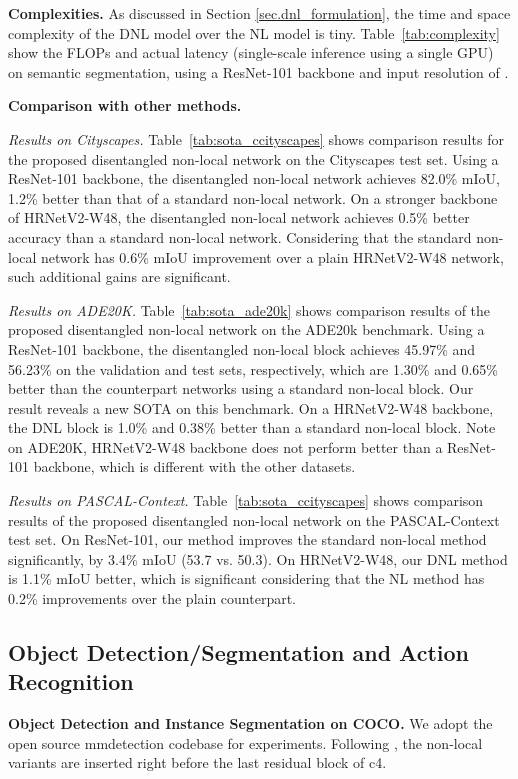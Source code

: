 \documentclass[runningheads]{llncs}
\begin{document}
\noindent \textbf{Complexities.} As discussed in Section \ref{sec.dnl_formulation}, the time and space complexity of the DNL model over the NL model is tiny. Table~\ref{tab:complexity} show the FLOPs and actual latency (single-scale inference using a single GPU) on semantic segmentation, using a ResNet-101 backbone and input resolution of .

\noindent \textbf{Comparison with other methods.}

\noindent \emph{Results on Cityscapes.}
Table~\ref{tab:sota_ccityscapes} shows comparison results for the proposed disentangled non-local network on the Cityscapes test set. Using a ResNet-101 backbone, the disentangled non-local network achieves 82.0\% mIoU, 1.2\% better than that of a standard non-local network. On a stronger backbone of HRNetV2-W48, the disentangled non-local network achieves 0.5\% better accuracy than a standard non-local network. Considering that the standard non-local network has 0.6\% mIoU improvement over a plain HRNetV2-W48 network, such additional gains are significant.

\noindent \emph{Results on ADE20K.}
Table~\ref{tab:sota_ade20k} shows comparison results of the proposed disentangled non-local network on the ADE20k benchmark.
Using a ResNet-101 backbone, the disentangled non-local block achieves 45.97\% and 56.23\% on the validation and test sets, respectively, which are 1.30\% and 0.65\% better than the counterpart networks using a standard non-local block. Our result reveals a new SOTA on this benchmark. On a HRNetV2-W48 backbone, the DNL block is 1.0\% and 0.38\% better than a standard non-local block. Note on ADE20K, HRNetV2-W48 backbone does not perform better than a ResNet-101 backbone, which is different with the other datasets.

\noindent \emph{Results on PASCAL-Context.}
Table~\ref{tab:sota_ccityscapes} shows comparison results of the proposed disentangled non-local network on the PASCAL-Context test set. On ResNet-101, our method improves the standard non-local method significantly, by 3.4\% mIoU (53.7 vs. 50.3). On HRNetV2-W48, our DNL method is 1.1\% mIoU better, which is significant considering that the NL method has 0.2\% improvements over the plain counterpart.

\subsection{Object Detection/Segmentation and Action Recognition}

\textbf{Object Detection and Instance Segmentation on COCO.}
We adopt the open source mmdetection \cite{chen2019mmdetection} codebase for experiments. Following \cite{wang2018non}, the non-local variants are inserted right before the last residual block of c4.
\end{document}
